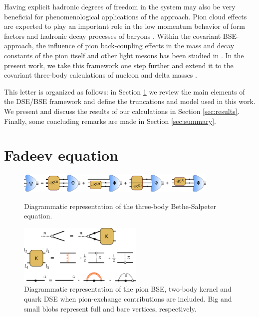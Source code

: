 Having explicit hadronic degrees of freedom in the system may also be very 
beneficial for phenomenological applications of the approach. Pion cloud effects 
are expected to play an important role in the low momentum behavior of 
form factors and hadronic decay processes of baryons
\cite{Thomas:1981vc,Miller:2002ig,Ramalho:2008dp,Cloet:2012cy,Eichmann:2011vu,%
Eichmann:2011aa,Sanchis-Alepuz:2013iia,NDg}. Within the covariant BSE-approach, 
the influence of pion back-coupling effects in the mass and decay 
constants of the pion itself and other light mesons has been studied in \cite{Fischer:2008wy}. 
In the present work, we take this framework one step further and extend it 
to the covariant three-body calculations of nucleon and delta masses 
\cite{Eichmann:2009qa,Eichmann:2009en,SanchisAlepuz:2011jn}. 

This letter is organized as follows: in Section \ref{sec:framework} we review the main elements of the DSE/BSE framework and define the truncations and model used in this work. We present and discuss the results of our calculations in Section \ref{sec:results}. Finally, some concluding remarks are made in Section \ref{sec:summary}.

\section{Fadeev equation}
\label{sec:framework}

\begin{figure}[hbtp]
 \begin{center}
  \includegraphics[width=0.86\textwidth,clip]{figures/full_BSE.eps}
 \end{center}
 \caption{Diagrammatic representation of the three-body Bethe-Salpeter equation.}\label{fig:faddeev_eq}
 \begin{center}
  \includegraphics[width=0.53\textwidth,clip]{figures/system_with_pion.eps}
 \end{center}
 \caption{Diagrammatic representation of the pion BSE, two-body kernel and quark DSE when pion-exchange contributions are included. Big and small blobs represent full and bare vertices, respectively.}\label{fig:system_with_pion}
\end{figure}


